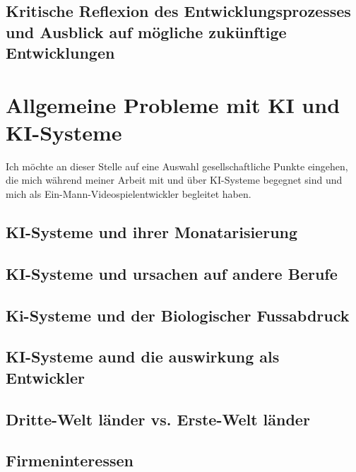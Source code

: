 \documentclass[10pt,a4paper,bibliography=totocnumbered,listof=totocnumbered]{scrartcl}
\begin{document}
\subsection{Kritische Reflexion des Entwicklungsprozesses und Ausblick auf mögliche zukünftige Entwicklungen}

\section{Allgemeine Probleme mit KI und KI-Systeme}
Ich möchte an dieser Stelle auf eine Auswahl gesellschaftliche Punkte eingehen, die mich während meiner Arbeit mit und über KI-Systeme begegnet sind und mich als Ein-Mann-Videospielentwickler begleitet haben.
\subsection{KI-Systeme und ihrer Monatarisierung}%
\subsection{KI-Systeme und ursachen auf andere Berufe}%
\subsection{Ki-Systeme und der Biologischer Fussabdruck}%
\subsection{KI-Systeme aund die auswirkung als Entwickler}%
\subsection{Dritte-Welt länder vs. Erste-Welt länder}%
\subsection{Firmeninteressen} %
\end{document}
